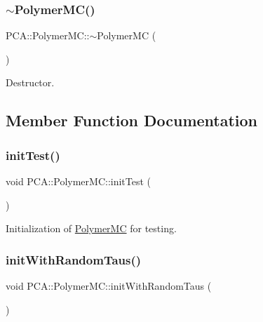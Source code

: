 \subsubsection{\texorpdfstring{$\sim$\+Polymer\+M\+C()}{~PolymerMC()}}
{\footnotesize\ttfamily P\+C\+A\+::\+Polymer\+M\+C\+::$\sim$\+Polymer\+MC (\begin{DoxyParamCaption}{ }\end{DoxyParamCaption})}



Destructor. 



\subsection{Member Function Documentation}
\hypertarget{class_p_c_a_1_1_polymer_m_c_a327234bb757279e61f1b47ba493aaaa2}{}\label{class_p_c_a_1_1_polymer_m_c_a327234bb757279e61f1b47ba493aaaa2} 
\subsubsection{\texorpdfstring{init\+Test()}{initTest()}}
{\footnotesize\ttfamily void P\+C\+A\+::\+Polymer\+M\+C\+::init\+Test (\begin{DoxyParamCaption}{ }\end{DoxyParamCaption})}



Initialization of \hyperlink{class_p_c_a_1_1_polymer_m_c}{Polymer\+MC} for testing. 

\hypertarget{class_p_c_a_1_1_polymer_m_c_ab075a6b6e2053461e15770d8db4f8917}{}\label{class_p_c_a_1_1_polymer_m_c_ab075a6b6e2053461e15770d8db4f8917} 
\subsubsection{\texorpdfstring{init\+With\+Random\+Taus()}{initWithRandomTaus()}}
{\footnotesize\ttfamily void P\+C\+A\+::\+Polymer\+M\+C\+::init\+With\+Random\+Taus (\begin{DoxyParamCaption}{ }\end{DoxyParamCaption})}



